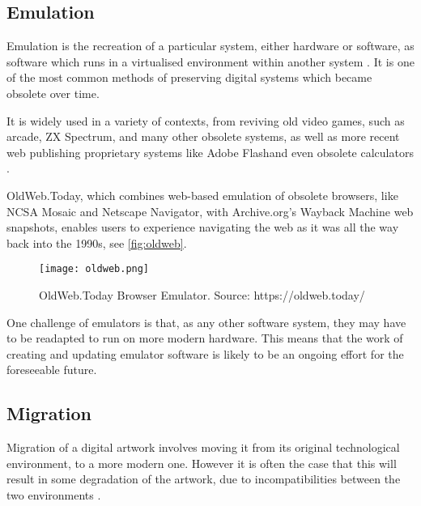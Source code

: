 \subsection{Emulation}

Emulation is the recreation of a particular system, either hardware or software, as software which runs in a virtualised environment within another system \cite{rothenbergUsingEmulationPreserve2000}. It is one of the most common methods of preserving digital systems which became obsolete over time.

It is widely used in a variety of contexts, from reviving old video games, such as arcade\footnotemark[1], ZX Spectrum\footnotemark[2], and many other obsolete systems\footnotemark[3], as well as more recent web publishing proprietary systems like Adobe Flash\footnotemark[4] and even obsolete calculators \cite{scottjasonCalculatedMoveCalculators2023}.


OldWeb.Today, which combines web-based \gls{emulation} of obsolete browsers, like NCSA Mosaic and Netscape Navigator, with Archive.org's Wayback Machine web snapshots, enables users to experience navigating the web as it was all the way back into the 1990s, see \autoref{fig:oldweb}.

\begin{figure}[h]
    \centering
    \captionsetup{justification=centering}
    \texttt{[image: oldweb.png]}
    \caption[OldWeb.Today Browser Emulator]{OldWeb.Today Browser Emulator. Source: https://oldweb.today/ }
    \label{fig:oldweb}
\end{figure}

One challenge of emulators is that, as any other software system, they may have to be readapted to run on more modern hardware. This means that the work of creating and updating emulator software is likely to be an ongoing effort for the foreseeable future.

\subsection{Migration}

Migration of a digital artwork involves moving it from its original technological environment, to a more modern one. However it is often the case that this will result in some degradation of the artwork, due to incompatibilities between the two environments \cite{huberNewMediaOld2013}.

